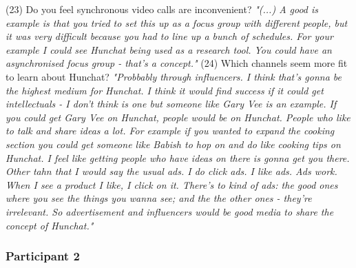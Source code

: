 \documentclass[12pt]{article}
\begin{document}
(23) Do you feel synchronous video calls are inconvenient? \textit{"(...) A good is example is that you tried to set this up as a focus group with different people, but it was very difficult because you had to line up a bunch of schedules. For your example I could see Hunchat being used as a research tool. You could have an asynchronised focus group - that's a concept."}
(24) Which channels seem more fit to learn about Hunchat? \textit{"Probbably through influencers. I think that's gonna be the highest medium for Hunchat. I think it would find success if it could get intellectuals - I don't think is one but someone like Gary Vee is an example. If you could get Gary Vee on Hunchat, people would be on Hunchat. People who like to talk and share ideas a lot. For example if you wanted to expand the cooking section you could get someone like Babish to hop on and do like cooking tips on Hunchat. I feel like getting people who have ideas on there is gonna get you there. Other tahn that I would say the usual ads. I do click ads. I like ads. Ads work. When I see a product I like, I click on it. There's to kind of ads: the good ones where you see the things you wanna see; and the the other ones - they're irrelevant. So advertisement and influencers would be good media to share the concept of Hunchat."}

\subsubsection{Participant 2}
\end{document}
